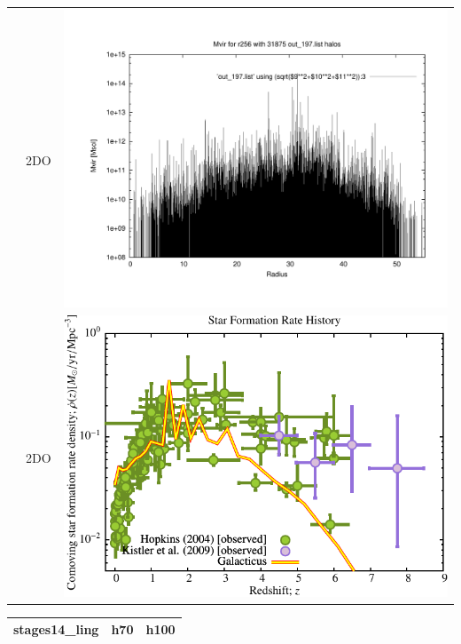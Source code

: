 \begin{itemize}
\begin{table}[p]
\begin{tabular}{l|c|c}
 & 2DO & \includegraphics[scale=0.25]{r256/h100/stages_14/plot_mvir_out_197.pdf} \\
 & 2DO & \includegraphics[scale=0.5]{r256/h100/stages_14/Plot_Star_Formation_History.pdf} \\
\end{tabular}
\end{table}
\begin{table}[p]
\centering
\begin{tabular}{l|c|c}
stages14\_ling & h70 & h100 \\
\hline 

\end{tabular}
\end{table}
\end{itemize}
